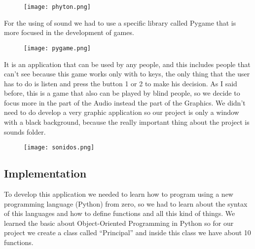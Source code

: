 \documentclass[12pt,letterpaper]{article}
\begin{document}
\begin{figure}[h]
\begin{center}
\texttt{[image: phyton.png]}\\
\end{center}
\end{figure}

\begin{raggedleft}
For the using of sound we had to use a specific library called Pygame that is more focused in the development of games.
\end{raggedleft}

\begin{figure}[h]
\begin{center}
\texttt{[image: pygame.png]}\\
\end{center}
\end{figure}

\begin{raggedleft}
It is an application that can be used by any people, and this includes people that can’t see because this game works only with to keys, the only thing that the user has to do is listen and press the button 1 or 2 to make his decision.
As I said before, this is a game that also can be played by blind people, so we decide to focus more in the part of the Audio instead the part of the Graphics.
We didn’t need to do develop a very graphic application so our project is only a window with a black background, because the really important thing about the project is sounds folder.
\end{raggedleft}

\begin{figure}[h]
\begin{center}
\texttt{[image: sonidos.png]}\\
\end{center}
\end{figure}

\subsection{Implementation}
\begin{raggedleft}
To develop this application we needed to learn how to program using a new programming language (Python) from zero, so we had to learn about the syntax of this languages and how to define functions and all this kind of things.
We learned the basic about Object-Oriented Programming in Python so for our project we create a class called “Principal” and inside this class we have about 10 functions.
\end{raggedleft}
\end{document}
